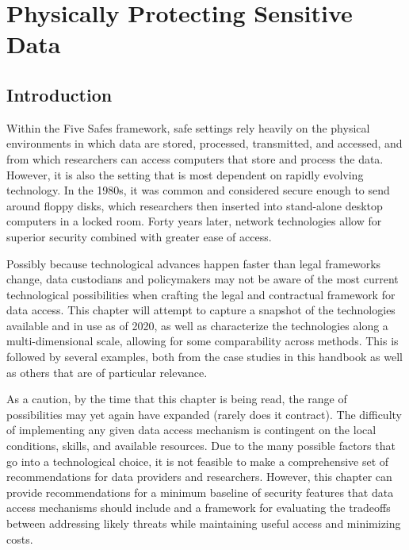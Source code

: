 \hypertarget{security}{%
\chapter{Physically Protecting Sensitive Data}\label{security}}

\hrulefill

\hypertarget{introduction}{%
\section{Introduction}\label{introduction}}

Within the Five Safes framework, safe settings rely heavily on the physical environments in which data are stored, processed, transmitted, and accessed, and from which researchers can access computers that store and process the data. However, it is also the setting that is most dependent on rapidly evolving technology. In the 1980s, it was common and considered secure enough to send around floppy disks, which researchers then inserted into stand-alone desktop computers in a locked room. Forty years later, network technologies allow for superior security combined with greater ease of access.

Possibly because technological advances happen faster than legal frameworks change, data custodians and policymakers may not be aware of the most current technological possibilities when crafting the legal and contractual framework for data access. This chapter will attempt to capture a snapshot of the technologies available and in use as of 2020, as well as characterize the technologies along a multi-dimensional scale, allowing for some comparability across methods. This is followed by several examples, both from the case studies in this handbook as well as others that are of particular relevance.

As a caution, by the time that this chapter is being read, the range of possibilities may yet again have expanded (rarely does it contract). The difficulty of implementing any given data access mechanism is contingent on the local conditions, skills, and available resources. Due to the many possible factors that go into a technological choice, it is not feasible to make a comprehensive set of recommendations for data providers and researchers. However, this chapter can provide recommendations for a minimum baseline of security features that data access mechanisms should include and a framework for evaluating the tradeoffs between addressing likely threats while maintaining useful access and minimizing costs.

